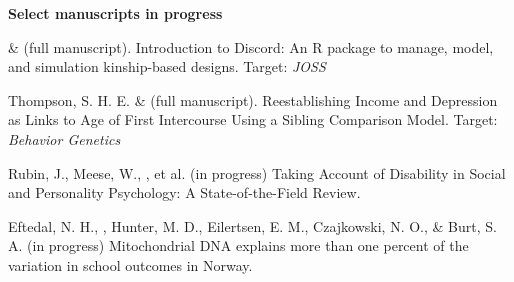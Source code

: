 %



{\large \textbf{Select manuscripts in progress}}

\begin{etaremune}
\item \jt \& \meb (full manuscript). Introduction to Discord: An R package to manage, model, and simulation kinship-based designs. Target: \textit{JOSS}


\item Thompson, S. H. E. \noteA \& \meb (full manuscript). Reestablishing Income and Depression as Links to Age of First Intercourse Using a Sibling Comparison Model. Target: \textit{Behavior Genetics}

\item Rubin, J., Meese, W., \meb, et al. (in progress) Taking Account of Disability in Social and Personality Psychology: A State-of-the-Field Review.

\item Eftedal, N. H., \meb, Hunter, M. D., Eilertsen, E. M., Czajkowski, N. O., \& Burt, S. A. (in progress) Mitochondrial DNA explains more than one percent of the variation in school outcomes in Norway. 




%
%


\end{etaremune}
